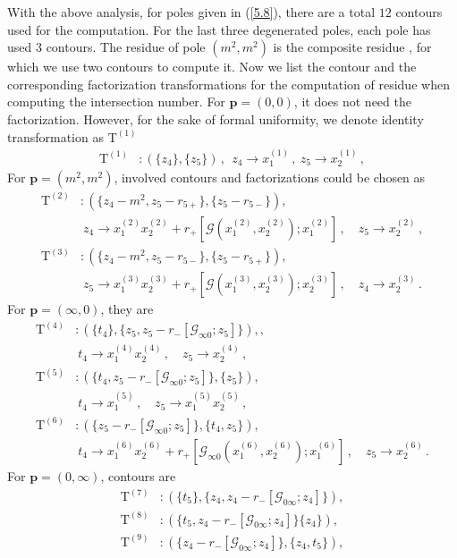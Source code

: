 \documentclass[a4paper,11pt]{article}
\newcommand{\nn}{\nonumber}
\newcommand{\nT}{\mathrm{T}}
\newcommand{\mG}{\mathcal{G}}
\def\eref#1{(\ref{#1})}
\begin{document}
With the above analysis, for poles given in \eref{5.8}, there are a total $12$ contours used for the computation. For the last three degenerated poles, each 
pole has used $3$ contours. The residue of pole $(m^2,m^2)$ is the composite residue \cite{Arkani-Hamed:2009ljj,tsikh1992multidimensional,auizenberg1983integral}, for which we use two contours to compute it. Now we list the contour and the corresponding factorization transformations for the computation of residue
when computing the intersection number. 
For $\bm{p}=(0,0)$, it does not need the factorization. However, for the sake of formal uniformity, we
 denote identity transformation as  $\nT^{(1)}$ 
\begin{align}
\nT^{(1)} &: (\{z_4\},\{z_5\})  \, , \ \  z_4\to x^{(1)}_1 \, , \ z_5\to x^{(1)}_2 \,,  \label{eq:T1reg}
\end{align}
For $\bm{p}=(m^2,m^2)$, involved contours and factorizations could be chosen as
\begin{align}
\nT^{(2)} &: (\{z_4-m^2,z_5-r_{5+}\} , \{z_5-r_{5-}\}),\nn\\
&~ z_4 \to x_1^{(2)} x_2^{(2)} +r_{+}[\mG(x_1^{(2)},x_2^{(2)});x_1^{(2)}] \,, \quad z_5 \to x_2^{(2)} \,,\nn\\
\nT^{(3)} &: (\{z_4-m^2,z_5-r_{5-}\} , \{z_5-r_{5+}\}),\nn\\
&~ z_5 \to x_1^{(3)} x_2^{(3)} +r_{+}[\mG(x_1^{(3)},x_2^{(3)});x_2^{(3)}] \,, \quad z_4 \to x_2^{(3)} \,.\label{eq:T23reg}
\end{align}
For $\bm{p}=(\infty,0)$, they are 
 \begin{align}
\nT^{(4)} &: (\{t_4\} , \{z_5,z_5-r_-[\mG_{\infty0};z_5]\}),,\nn\\
&~t_4 \to x_1^{(4)} x_2^{(4)} \,, \quad z_5 \to x_2^{(4)} \,, \nn
\\
\nT^{(5)} &: (\{t_4,z_5-r_-[\mG_{\infty0};z_5]\},\{z_5\}),\nn\\
&~ t_4 \to x_1^{(5)} \,, \quad z_5 \to x_1^{(5)} x_2^{(5)} \,, \nn
\\
\nT^{(6)} &: (\{z_5-r_-[\mG_{\infty0};z_5] \}, \{t_4,z_5\}), \nn\\
&~t_4 \to x_1^{(6)} x_2^{(6)} + r_{+}[\mG_{\infty0}(x_1^{(6)},x_2^{(6)});x_1^{(6)}] \,, \quad z_5\to  x_2^{(6)} \,.
\end{align}
For $\bm{p}=(0,\infty)$, contours are
 \begin{align}
\nT^{(7)} &: (\{t_5\} , \{z_4,z_4-r_-[\mG_{0\infty};z_4]\}),\nn\\
\nT^{(8)} &: (\{t_5,z_4-r_-[\mG_{0\infty};z_4]\}\{z_4\} ),\nn\\
\nT^{(9)} &: (\{z_4-r_-[\mG_{0\infty};z_4]\} , \{z_4,t_5\}),
\end{align}
\end{document}

